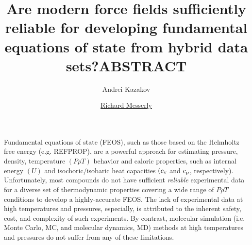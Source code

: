 \documentclass[11pt,a4paper]{article}
\begin{document}
	\thispagestyle{empty}
	\title{\Large \textbf{Are modern force fields sufficiently reliable for developing fundamental equations of state from hybrid data sets?}} %
	\author[1]{\large {Andrei Kazakov}}
	\author[1]{\large {\underline{Richard Messerly}}}%
	
	
	\date{} %
	\maketitle\thispagestyle{empty} %
	\begin{center}
		\title{\textbf{ABSTRACT}}\centering{}
	\end{center}
	\justify
	
	
	
	Fundamental equations of state (FEOS), such as those based on the Helmholtz free energy (e.g. REFPROP), are a powerful approach for estimating pressure, density, temperature $(P\rho T)$ behavior and caloric properties, such as internal energy $(U)$ and isochoric/isobaric heat capacities $(c_{\rm v}$ and $c_{\rm p}$, respectively). Unfortunately, most compounds do not have sufficient \textit{reliable} experimental data for a diverse set of thermodynamic properties covering a wide range of $P \rho T$ conditions to develop a highly-accurate FEOS. The lack of experimental data at high temperatures and pressures, especially, is attributed to the inherent safety, cost, and complexity of such experiments. By contrast, molecular simulation (i.e. Monte Carlo, MC, and molecular dynamics, MD) methods at high temperatures and pressures do not suffer from any of these limitations.
	
\end{document}

